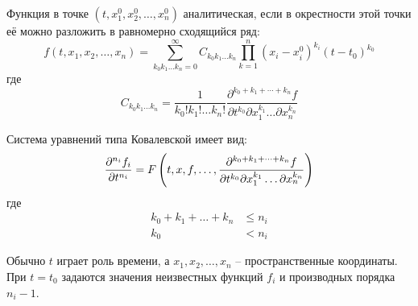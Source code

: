 \setcounter{equation}{0}

\begin{defin}
	Функция в точке $(t, x_1^0, x_2^0, \ldots , x_n^0)$ аналитическая, если в окрестности этой точки её можно разложить в равномерно сходящийся ряд:\\
		\[f(t, x_1, x_2, \ldots, x_n) = \sum\limits_{k_0k_1 \ldots k_n = 0}^{\infty} C_{k_0k_1 \ldots k_n} \prod\limits_{k=1}^{n} (x_i - x_i^0)^{k_i} (t - t_0)^{k_0}\]
		где
		\[C_{k_0 k_1  \ldots k_n} = \frac{1}{k_0!k_1! \ldots k_n!} \frac{\partial^{k_0 + k_1 + \cdots + k_n}f}{\partial t^{k_0}\partial x_1^{k_1} \ldots \partial x_n^{k_n}}\]
	\end{defin}


	\begin{defin} 

	Система уравнений типа Ковалевской имеет вид:
\begin{equation}
	\frac{\partial^{n_i}f_i}{\partial t^{n_i}} = F \left(t, x, f, \ldots, \frac{\partial^{k_0 + k_1 + \cdots + k_n}f}{\partial t^{k_0}\partial x_1^{k_1} \ldots \partial x_n^{k_n}} \right)
	\label{equ:equNormal}
\end{equation}
где
	\begin{align*}
		k_0 + k_1 + \dots + k_n &\leqslant n_i\\
		k_0 &< n_i
	\end{align*}
\end{defin}

	Обычно $t$ играет роль времени, а $x_1, x_2, \ldots, x_n$ -- пространственные координаты. При $t = t_0$ задаются значения неизвестных функций $f_i$ и производных порядка $n_i - 1$.


